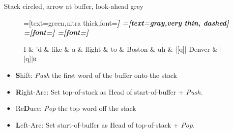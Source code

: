\documentclass{lecture}
\begin{document}
\begin{plain}{Stack circled, arrow at buffer, look-ahead grey}
\begin{figure}
    \centering
    \begin{dependency}[theme=simple]
    =[text=green,ultra thick,font=\bfseries\itshape]
    =[text=gray,very thin, dashed]
    =[font=\bfseries\itshape]
    =[font=\itshape]
    \begin{deptext}[column sep=.075cm, row sep=.1ex]
        I \& 'd \& like \& a \& flight \& to \& Boston \&  uh \& |[q]| Denver \& |[q]|\textsc{r} \\
    \end{deptext}
\end{dependency}
\end{figure}
    \begin{itemize}
        \item \textbf{S}hift: \emph{Push} the first word of the buffer onto the stack
    \item \textbf{R}ight-Arc: Set top-of-stack as Head of start-of-buffer + \emph{Push}.
    \item Re\textbf{D}uce: \emph{Pop} the top word off the stack
    \item \textbf{L}eft-Arc: Set start-of-buffer as Head of top-of-stack + \emph{Pop}.
    \end{itemize}
\end{plain}
\end{document}
